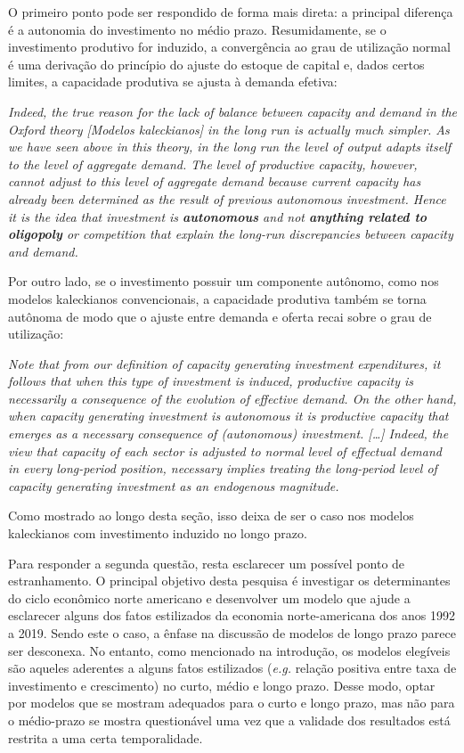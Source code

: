 O primeiro ponto pode ser respondido de forma mais direta: a principal diferença é a autonomia do investimento no médio prazo.  Resumidamente, se o investimento produtivo for induzido, a convergência ao grau de utilização normal é uma derivação do princípio do ajuste do estoque de capital e, dados certos limites, a capacidade produtiva se ajusta à demanda efetiva:

\begin{citacao}
	\textit{Indeed, the true reason for the lack of balance between capacity and demand in the Oxford theory [Modelos kaleckianos] in the long run is actually much simpler. As we have seen above in this theory, in the long run the level of output adapts itself to the level of aggregate demand. The level of productive capacity, however, cannot adjust to this level of aggregate demand because current capacity has already been determined as the result of previous autonomous investment. Hence it is the idea that investment is \textbf{autonomous} and not \textbf{anything related to oligopoly} or competition that explain the long-run discrepancies between capacity and demand.}
	\cite[p.~120, grifos adicionados]{serrano_sraffian_1995}
\end{citacao}
Por outro lado, se o investimento possuir um componente autônomo, como nos modelos kaleckianos convencionais, a capacidade produtiva também se torna autônoma de modo que o ajuste entre demanda e oferta recai sobre o grau de utilização:
\begin{citacao}
	\textit{Note that from our definition of capacity generating investment expenditures, it follows that when this type of investment is induced, productive capacity is necessarily a consequence of the evolution of effective demand. On the other hand, when capacity generating investment is autonomous it is productive capacity that emerges as a necessary consequence of (autonomous) investment. […] Indeed, the view that capacity of each sector is adjusted to normal level of effectual demand in every long-period position, necessary implies treating the long-period level of capacity generating investment as an endogenous magnitude.} \cite[p.~77]{serrano_sraffian_1995}
\end{citacao}
Como mostrado ao longo desta seção, isso deixa de ser o caso nos modelos kaleckianos com investimento induzido no longo prazo.

Para responder a segunda questão, resta esclarecer um possível ponto de estranhamento. O principal objetivo desta pesquisa é investigar os determinantes do ciclo econômico norte americano e desenvolver um modelo que ajude a esclarecer alguns dos fatos estilizados da economia norte-americana dos anos 1992 a 2019. Sendo este o caso, a ênfase na discussão de modelos de longo prazo parece ser desconexa. 
No entanto, como mencionado na introdução, os modelos elegíveis são aqueles aderentes a alguns fatos estilizados (\textit{e.g.} relação positiva entre taxa de investimento e crescimento)  no curto, médio e longo prazo.
Desse modo, optar por modelos que se mostram adequados para o curto e longo prazo, mas não para o médio-prazo se mostra questionável uma vez que a validade dos resultados está restrita a uma certa temporalidade. 

